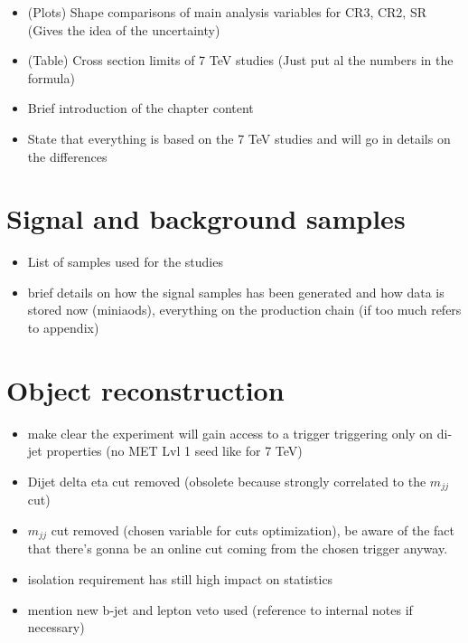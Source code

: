 
\begin{itemize}
	\item (Plots) Shape comparisons of main analysis variables for CR3, CR2, SR (Gives the idea of the uncertainty)
	\item (Table) Cross section limits of 7 TeV studies (Just put al the numbers in the formula)
\end{itemize}

\begin{itemize}
	\item Brief introduction of the chapter content
	\item State that everything is based on the 7 TeV studies and will go in details on the differences
\end{itemize}



\section{Signal and background samples}

\begin{itemize}
	\item List of samples used for the studies
	\item brief details on how the signal samples has been generated and how data is stored now (miniaods), everything on the production chain (if too much refers to appendix)
\end{itemize}



\section{Object reconstruction}
\begin{itemize}
	\item make clear the experiment will gain access to a trigger triggering only on di-jet properties (no MET Lvl 1 seed like for 7 TeV)
	\item Dijet delta eta cut removed (obsolete because strongly correlated to the $m_{jj}$ cut) 
	\item $m_{jj}$ cut removed (chosen variable for cuts optimization), be aware of the fact that there's gonna be an online cut coming from the chosen trigger anyway.
	\item \hadtau isolation requirement has still high impact on statistics
	\item mention new b-jet and lepton veto used (reference to internal notes if necessary)
\end{itemize}

